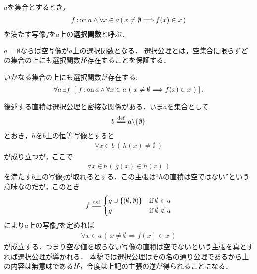 	
	\begin{screen}
		\begin{dfn}[選択関数]
			$a$を集合とするとき，
			\begin{align}
				f \operatorname*{:on} a \wedge \forall x \in a\, (\, x \neq \emptyset \Longrightarrow f(x) \in x\, )
			\end{align}
			を満たす写像$f$を$a$上の{\bf 選択関数}と呼ぶ．
		\end{dfn}
	\end{screen}
	
	$a = \emptyset$ならば空写像が$a$上の選択関数となる．
	選択公理とは，空集合に限らずどの集合の上にも選択関数が存在することを保証する．
	
	\begin{screen}
		\begin{axm}[選択公理]
			いかなる集合の上にも選択関数が存在する:
			\begin{align}
				\forall a\, \exists f\ \left[\ 
				f \fon a \wedge \forall x \in a\ 
				(\ x \neq \emptyset \Longrightarrow f(x) \in x\ )\ \right]. 
			\end{align}
		\end{axm}
	\end{screen}
	
	後述する直積は選択公理と密接な関係がある．いま$a$を集合として
	\begin{align}
		b \defeq a \backslash \{\emptyset\}
	\end{align}
	とおき，$h$を$b$上の恒等写像とすると
	\begin{align}
		\forall x \in b\, (\, h(x) \neq \emptyset\, )
	\end{align}
	が成り立つが，ここで
	\begin{align}
		\forall x \in b\, (\, g(x) \in h(x)\, )
	\end{align}
	を満たす$b$上の写像$g$が取れるとする．この主張は``$h$の直積は空ではない''という意味なのだが，このとき
	\begin{align}
		f \defeq 
		\begin{cases}
			g \cup \{(\emptyset,\emptyset)\} & \mbox{if } \emptyset \in a \\
			g & \mbox{if } \emptyset \notin a
		\end{cases}
	\end{align}
	により$a$上の写像$f$を定めれば
	\begin{align}
		\forall x \in a\, (\, x \neq \emptyset \Longrightarrow f(x) \in x\, )
	\end{align}
	が成立する．つまり空な値を取らない写像の直積は空でないという主張を真とすれば選択公理が導かれる．
	本稿では選択公理はその名の通り公理であるから上の内容は無意味であるが，今度は上記の主張の逆が得られることになる．
	
